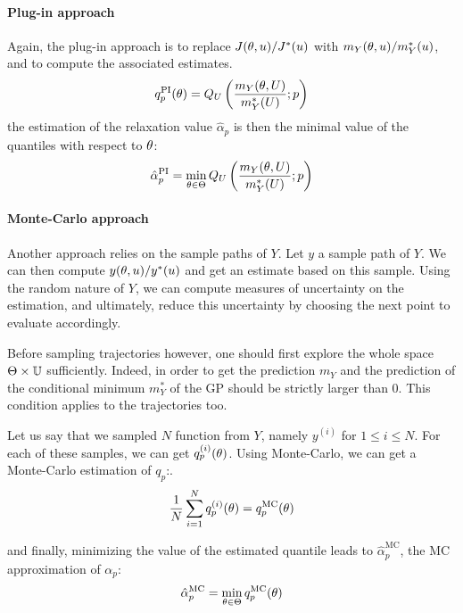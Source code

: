 \documentclass[../../Main_ManuscritThese.tex]{subfiles}
\begin{document}
\paragraph{Plug-in approach}
Again, the plug-in approach is to replace $J(\theta, u)/J^*(u)$ with $m_Y(\theta, u) / m^*_Y(u)$, and to compute the associated estimates.
\begin{equation}
  q_{p}^{\mathrm{PI}}(\theta) = Q_{U}\left(\frac{m_Y(\theta, U)}{m^*_Y(U)};p\right)
\end{equation}
the estimation of the relaxation value $\hat{\alpha}_p$ is then the minimal value of the quantiles with respect to $\theta$:
\begin{equation}
    \label{eq:def_plugin_alpha}
  \hat{\alpha}^{\mathrm{PI}}_p = \min_{\kk \in \Kspace} Q_U\left(\frac{m_Y(\kk, \UU)}{m^*_Y(\UU)};p\right) %
\end{equation}

\paragraph{Monte-Carlo approach}
Another approach relies on the sample paths of $Y$. Let $y$ a sample path of $Y$. We can then compute $y(\theta, u)/y^*(u)$ and get an estimate based on this sample. 
Using the random nature of $Y$, we can compute measures of uncertainty on the estimation, and ultimately, reduce this uncertainty by choosing the next point to evaluate accordingly.

Before sampling trajectories however, one should first explore the whole space $\Theta \times \mathbb{U}$ sufficiently. Indeed, in order to get the prediction $m_Y$ and the prediction of the conditional minimum $m^*_{Y}$ of the GP should be strictly larger than $0$. This condition applies to the trajectories too.

Let us say that we sampled $N$ function from $Y$, namely $y^{(i)}$ for $1 \leq i \leq N$. For each of these samples, we can get $q^{(i)}_p(\theta)$. Using Monte-Carlo, we can get a Monte-Carlo estimation of $q_p$:.
\begin{equation}
 \frac{1}{N} \sum_{i=1}^N q_p^{(i)}(\theta) = q_p^{\mathrm{MC}}(\theta)
\end{equation}

and finally, minimizing the value of the estimated quantile leads to $\hat{\alpha}_p^{\mathrm{MC}}$, the MC approximation of $\alpha_p$: 
\begin{equation}
  \hat{\alpha}_p^{\mathrm{MC}} = \min_{\theta \in \Theta} q_p^{\mathrm{MC}}(\theta)
\end{equation}
\end{document}
